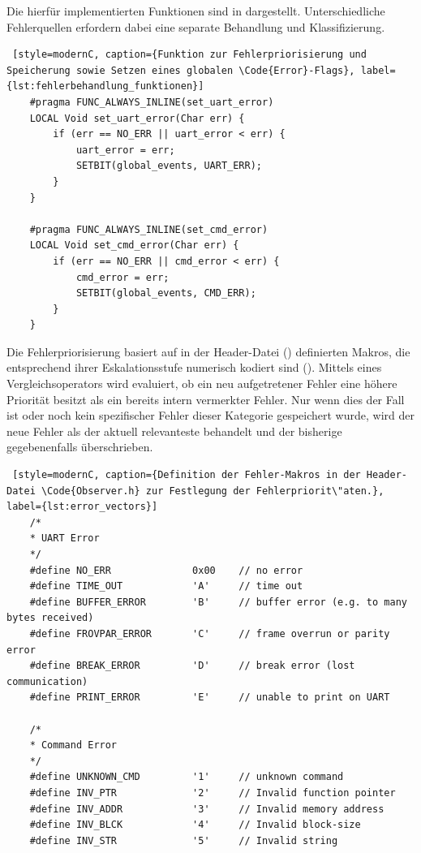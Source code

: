 \newpage
Die hierf\"ur implementierten Funktionen sind in  dargestellt. Unterschiedliche Fehlerquellen erfordern dabei eine separate Behandlung und Klassifizierung. 

\vspace{0.5cm}
\begin{lstlisting} [style=modernC, caption={Funktion zur Fehlerpriorisierung und Speicherung sowie Setzen eines globalen \Code{Error}-Flags}, label={lst:fehlerbehandlung_funktionen}]
	#pragma FUNC_ALWAYS_INLINE(set_uart_error)
	LOCAL Void set_uart_error(Char err) {
		if (err == NO_ERR || uart_error < err) {
			uart_error = err;
			SETBIT(global_events, UART_ERR);
		}
	}
	
	#pragma FUNC_ALWAYS_INLINE(set_cmd_error)
	LOCAL Void set_cmd_error(Char err) {
		if (err == NO_ERR || cmd_error < err) {
			cmd_error = err;
			SETBIT(global_events, CMD_ERR);
		}
	}
\end{lstlisting}

Die Fehlerpriorisierung basiert auf in der Header-Datei () definierten Makros, die entsprechend ihrer Eskalationsstufe numerisch kodiert sind (\Vgl {}). Mittels eines Vergleichsoperators wird evaluiert, ob ein neu aufgetretener Fehler eine h\"ohere Priorit\"at besitzt als ein bereits intern vermerkter Fehler. Nur wenn dies der Fall ist oder noch kein spezifischer Fehler dieser Kategorie gespeichert wurde, wird der neue Fehler als der aktuell relevanteste behandelt und der bisherige gegebenenfalls \"uberschrieben.

\newpage
\begin{lstlisting} [style=modernC, caption={Definition der Fehler-Makros in der Header-Datei \Code{Observer.h} zur Festlegung der Fehlerpriorit\"aten.}, label={lst:error_vectors}]
	/*
	* UART Error
	*/
	#define NO_ERR              0x00    // no error
	#define TIME_OUT            'A'     // time out
	#define BUFFER_ERROR        'B'     // buffer error (e.g. to many bytes received)
	#define FROVPAR_ERROR       'C'     // frame overrun or parity error
	#define BREAK_ERROR         'D'     // break error (lost communication)
	#define PRINT_ERROR         'E'     // unable to print on UART
	
	/*
	* Command Error
	*/
	#define UNKNOWN_CMD         '1'     // unknown command
	#define INV_PTR             '2'     // Invalid function pointer
	#define INV_ADDR            '3'     // Invalid memory address
	#define INV_BLCK            '4'     // Invalid block-size
	#define INV_STR             '5'     // Invalid string
\end{lstlisting}

